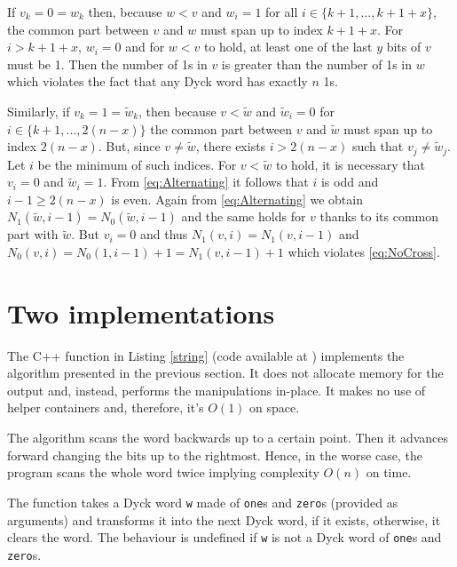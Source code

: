 \documentclass[a4paper]{article}
\begin{document}
If $v_k = 0 = w_k$ then, because $w < v$ and $w_i = 1$ for all $i\in\{k + 1, ..., k + 1 + x\}$, the common part between $v$ and $w$ must span up to index $k + 1 + x$.
For $i > k + 1 + x$, $w_i = 0$ and for $w < v$ to hold, at least one of the last $y$ bits of $v$ must be 1.
Then the number of 1s in $v$ is greater than the number of 1s in $w$ which violates the fact that any Dyck word has exactly $n$ 1s.

Similarly, if $v_k = 1 = \tilde w_k$, then because $v < \tilde w$ and $\tilde w_i = 0$ for $i\in\{k + 1, ..., 2(n - x)\}$ the common part between $v$ and $\tilde w$ must span up to index $2(n - x)$.
But, since $v\ne\tilde w$, there exists $i > 2(n - x)$ such that $v_j\ne\tilde w_j$.
Let $i$ be the minimum of such indices.
For $v < \tilde w$ to hold, it is necessary that $v_i = 0$ and $\tilde w_i = 1$.
From \eqref{eq:Alternating} it follows that $i$ is odd and $i - 1\ge 2(n - x)$ is even.
Again from \eqref{eq:Alternating} we obtain $N_1(\tilde w, i - 1) = N_0(\tilde w, i - 1)$ and the same holds for $v$ thanks to its common part with $\tilde w$.
But $v_i = 0$ and thus $N_1(v, i) = N_1(v, i - 1)$ and $N_0(v, i) = N_0(1, i - 1) + 1 = N_1(v, i - 1) + 1$ which violates \eqref{eq:NoCross}.



\section{Two implementations}

The C++ function in Listing \ref{string} (code available at \cite{Neri}) implements the algorithm presented in the previous section.
It does not allocate memory for the output and, instead, performs the manipulations in-place.
It makes no use of helper containers and, therefore, it's $O(1)$ on space.

The algorithm scans the word backwards up to a certain point.
Then it advances forward changing the bits up to the rightmost.
Hence, in the worse case, the program scans the whole word twice implying complexity $O(n)$ on time.

The function takes a Dyck word \verb+w+ made of \verb+one+s and \verb+zero+s (provided as arguments) and transforms it into the next Dyck word, if it exists, otherwise, it clears the word.
The behaviour is undefined if \verb+w+ is not a Dyck word of \verb+one+s and \verb+zero+s.
\end{document}
